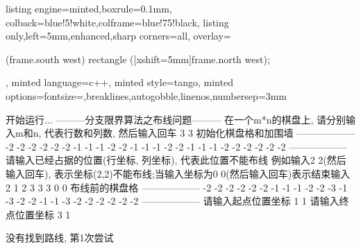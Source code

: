 \documentclass{article}
\begin{document}
\begin{homeworkProblem}
\begin{itemize}
\begin{tcblisting}{listing engine=minted,boxrule=0.1mm,
colback=blue!5!white,colframe=blue!75!black,
listing only,left=5mm,enhanced,sharp corners=all,
overlay={\begin{tcbclipinterior} (frame.south west)
rectangle ([xshift=5mm]frame.north west);\end{tcbclipinterior}},
minted language=c++,
minted style=tango,
minted options={fontsize=\small,breaklines,autogobble,linenos,numbersep=3mm}}
开始运行...
---------分支限界算法之布线问题---------
在一个m*n的棋盘上, 请分别输入m和n, 代表行数和列数, 然后输入回车
3 3
初始化棋盘格和加围墙
------------------
-2 -2 -2 -2 -2 
-2 -1 -1 -1 -2 
-2 -1 -1 -1 -2 
-2 -1 -1 -1 -2 
-2 -2 -2 -2 -2 
------------------
请输入已经占据的位置(行坐标, 列坐标), 代表此位置不能布线
例如输入2 2(然后输入回车), 表示坐标(2,2)不能布线;当输入坐标为0 0(然后输入回车)表示结束输入
2 1
2 3
3 3
0 0
布线前的棋盘格
------------------
-2 -2 -2 -2 -2 
-2 -1 -1 -1 -2 
-2 -3 -1 -3 -2 
-2 -1 -1 -3 -2 
-2 -2 -2 -2 -2 
------------------
请输入起点位置坐标
1 1
请输入终点位置坐标
3 1

没有找到路线, 第1次尝试


\end{tcblisting}
\end{itemize}
\end{homeworkProblem}
\end{document}
